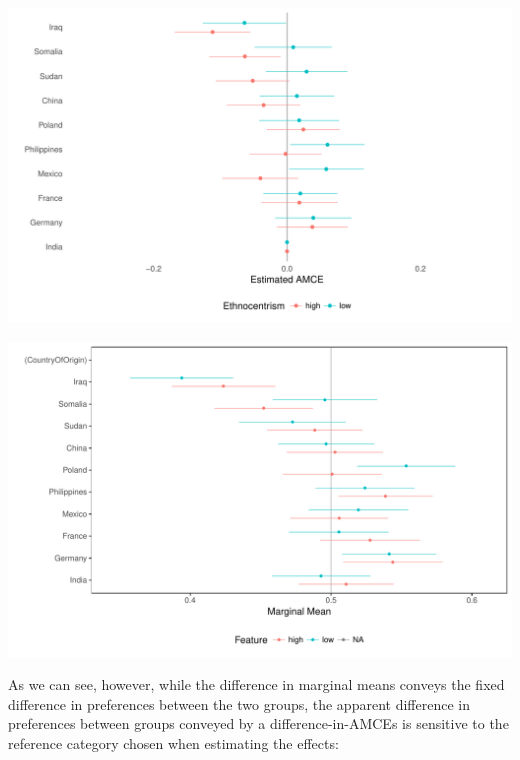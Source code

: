 \documentclass[a4paper,12pt]{article}\usepackage[]{graphicx}\usepackage[]{color}
\makeatletter
\def\maxwidth{ %
  \ifdim\Gin@nat@width>\linewidth
    \linewidth
  \else
    \Gin@nat@width
  \fi
}
\newenvironment{knitrout}{}{} %
\makeatother
\begin{document}
\begin{knitrout}
\color{fgcolor}
\includegraphics[width=\maxwidth]{figure/r_subgroup_results_amce-1} 

\end{knitrout}

\begin{knitrout}
\color{fgcolor}
\includegraphics[width=\maxwidth]{figure/r_subgroup_marginal_means-1} 

\end{knitrout}

As we can see, however, while the difference in marginal means conveys the fixed difference in preferences between the two groups, the apparent difference in preferences between groups conveyed by a difference-in-AMCEs is sensitive to the reference category chosen when estimating the effects:

\clearpage
\end{document}
